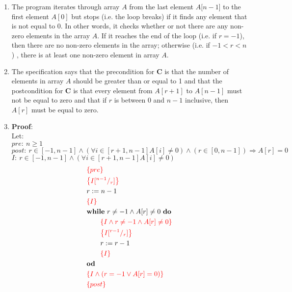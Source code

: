 \documentclass[a4paper]{article}
\newcommand{\assn}[1]{{\color{red}\left\{#1\right\}}}
\begin{document}
\begin{enumerate}



\item The program iterates through array \(A\) from the last element \(A[n-1\)] to the first element \(A[0]\) but stops (i.e. the loop breaks) if it finds any element that is not equal to 0. In other words, it checks whether or not there are any non-zero elements in the array \(A\). If it reaches the end of the loop (i.e. if \(r = -1\)), then there are no non-zero elements in the array; otherwise (i.e. if \(-1 < r < n\)) , there is at least one non-zero element in array \(A\).\\

\item \noindent The specification says that the precondition for \textbf{C} is that the number of elements in array \(A\) should be greater than or equal to 1 and that the postcondition for \textbf{C} is that every element from \(A[r+1]\) to \(A[n-1]\) must not be equal to zero and that if \(r\) is between 0 and \(n-1\) inclusive, then \(A[r]\) must be equal to zero.\\

\item \textbf{Proof}:\\
\vspace{3mm}
Let: \\
\vspace{2mm}
\qquad\(pre:~n \geq 1\)\\
\vspace{2mm}
\qquad \(post:~r \in [-1,n-1] \wedge (\forall i \in [r+1,n-1]A[i]\neq 0) \wedge (r \in [0,n-1]) \Rightarrow A[r] = 0 \)\\
\vspace{2mm}
\qquad \(I :~ r \in [-1,n-1] \wedge (\forall i \in [r+1,n-1]A[i]\neq 0)\)\\



\begin{align}
  & \assn{pre}\\
  & \assn{I\subst{n-1}r}\\
  & r \Ass n-1\notag\\
  & \assn{I}\\
  & \WHILE~ r\neq -1 \wedge A[r]\neq 0 ~\DO\notag\\
  & \qquad\assn{I \wedge r\neq -1 \wedge A[r]\neq 0}\\
  & \qquad\assn{I\subst{r-1}r}\\
  & \qquad r \Ass r-1\notag\\
  & \qquad\assn{I}\\
  & \OD\notag\\
  & \assn{I \wedge (r = -1 \vee A[r] = 0)}\\
  & \assn{post}
\end{align}


\end{enumerate}
\end{document}
